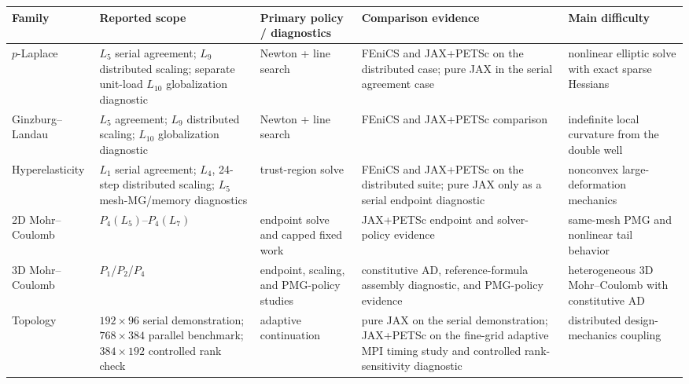 \begin{tabular}{@{}>{\RaggedRight\arraybackslash}p{} >{\RaggedRight\arraybackslash}p{} >{\RaggedRight\arraybackslash}p{} >{\RaggedRight\arraybackslash}p{} >{\RaggedRight\arraybackslash}p{}@{}}
\toprule
Family & Reported scope & Primary policy / diagnostics & Comparison evidence & Main difficulty \\
\midrule
$p$-Laplace & $L_{5}$ serial agreement; $L_{9}$ distributed scaling; separate unit-load $L_{10}$ globalization diagnostic & Newton + line search & FEniCS and JAX+PETSc on the distributed case; pure JAX in the serial agreement case & nonlinear elliptic solve with exact sparse Hessians \\
Ginzburg--Landau & $L_{5}$ agreement; $L_{9}$ distributed scaling; $L_{10}$ globalization diagnostic & Newton + line search & FEniCS and JAX+PETSc comparison & indefinite local curvature from the double well \\
Hyperelasticity & $L_{1}$ serial agreement; $L_{4}$, 24-step distributed scaling; $L_{5}$ mesh-MG/memory diagnostics & trust-region solve & FEniCS and JAX+PETSc on the distributed suite; pure JAX only as a serial endpoint diagnostic & nonconvex large-deformation mechanics \\
2D Mohr--Coulomb & $P_{4}(L_{5})$--$P_{4}(L_{7})$ & endpoint solve and capped fixed work & JAX+PETSc endpoint and solver-policy evidence & same-mesh PMG and nonlinear tail behavior \\
3D Mohr--Coulomb & $P_{1}$/$P_{2}$/$P_{4}$ & endpoint, scaling, and PMG-policy studies & constitutive AD, reference-formula assembly diagnostic, and PMG-policy evidence & heterogeneous 3D Mohr--Coulomb with constitutive AD \\
Topology & $192\times96$ serial demonstration; $768\times384$ parallel benchmark; $384\times192$ controlled rank check & adaptive continuation & pure JAX on the serial demonstration; JAX+PETSc on the fine-grid adaptive MPI timing study and controlled rank-sensitivity diagnostic & distributed design-mechanics coupling \\
\bottomrule
\end{tabular}
